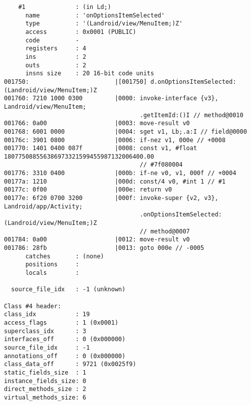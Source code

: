 \begin{lstlisting}
    #1              : (in Ld;)
      name          : 'onOptionsItemSelected'
      type          : '(Landroid/view/MenuItem;)Z'
      access        : 0x0001 (PUBLIC)
      code          -
      registers     : 4
      ins           : 2
      outs          : 2
      insns size    : 20 16-bit code units
001750:                        |[001750] d.onOptionsItemSelected:(Landroid/view/MenuItem;)Z
001760: 7210 1000 0300         |0000: invoke-interface {v3}, Landroid/view/MenuItem;
                                      .getItemId:()I // method@0010
001766: 0a00                   |0003: move-result v0
001768: 6001 0000              |0004: sget v1, Lb;.a:I // field@0000
00176c: 3901 0800              |0006: if-nez v1, 000e // +0008
001770: 1401 0400 087f         |0008: const v1, #float 180775088556386973321599455987132006400.00
                                      // #7f080004
001776: 3310 0400              |000b: if-ne v0, v1, 000f // +0004
00177a: 1210                   |000d: const/4 v0, #int 1 // #1
00177c: 0f00                   |000e: return v0
00177e: 6f20 0700 3200         |000f: invoke-super {v2, v3}, Landroid/app/Activity;
                                      .onOptionsItemSelected:(Landroid/view/MenuItem;)Z
                                      // method@0007
001784: 0a00                   |0012: move-result v0
001786: 28fb                   |0013: goto 000e // -0005
      catches       : (none)
      positions     :
      locals        :

  source_file_idx   : -1 (unknown)

Class #4 header:
class_idx           : 19
access_flags        : 1 (0x0001)
superclass_idx      : 3
interfaces_off      : 0 (0x000000)
source_file_idx     : -1
annotations_off     : 0 (0x000000)
class_data_off      : 9721 (0x0025f9)
static_fields_size  : 1
instance_fields_size: 0
direct_methods_size : 2
virtual_methods_size: 6


\end{lstlisting}
